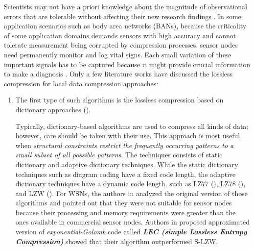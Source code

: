 Scientists may not have a priori knowledge about the magnitude of observational errors that are tolerable without affecting their new research findings \cite{Liang2010}. In some application scenarios such as body area networks (BANs), because the criticality of some application domains demands sensors with high accuracy and cannot tolerate measurement being corrupted by compression processes, sensor nodes need permanently monitor and log vital signs. Each small variation of these important signals has to be captured because it might provide crucial information to make a diagnosis \cite{Marcelloni2009}. Only a few literature works
have discussed the lossless compression for local data compression approaches:
\begin{enumerate}
    \item The first type of such algorithms is the lossless compression based on dictionary approaches (\cite{Marcelloni2009, Sadler2006}).

        Typically, dictionary-based algorithms are used to compress all kinds of data; however, care should be taken with their use. This approach is most useful when \emph{\textcolor[rgb]{1,0,0}{structural constraints restrict the frequently occurring patterns to a small subset of all possible patterns}}. The techniques consists of \textcolor[rgb]{1,0,0}{static dictionary} and \textcolor[rgb]{1,0,0}{adaptive dictionary} techniques. While the static dictionary techniques such as \textcolor[rgb]{1,0,0}{diagram coding have a fixed code length}, the adaptive dictionary techniques have a \textcolor[rgb]{1,0,0}{dynamic code length}, such as LZ77 (\cite{Ziv1977}), LZ78 (\cite{Ziv1978}), and LZW (\cite{Welch1984}). For WSNs, the authors in \cite{Barr2006, Sadler2006} analyzed the original version of those algorithms and pointed out that they were \textcolor[rgb]{0,0,1}{not suitable for sensor nodes because their processing and memory requirements were greater than the ones available in commercial sensor nodes}. Authors in \cite{Marcelloni2009} proposed approximated version of \emph{exponential-Golomb} code called \emph{\textbf{\textcolor[rgb]{1,0,0}{LEC (simple Lossless Entropy Compression)}}} showed that their algorithm outperformed S-LZW. 


\end{enumerate}
